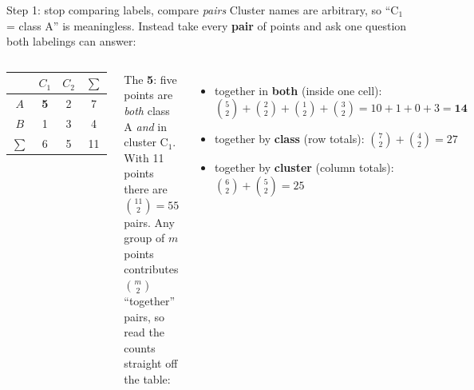 \documentclass[aspectratio=169]{beamer}
\begin{document}
\begin{frame}{Step 1: stop comparing labels, compare \emph{pairs}}
  Cluster names are arbitrary, so ``C$_1$ = class A'' is meaningless. Instead take every
  \textbf{pair} of points and ask one question both labelings can answer:
  \vskip 2pt
  \begin{center}
  \end{center}
  \vskip 4pt
  \begin{columns}[T]
    \begin{center}\small
      \renewcommand{\arraystretch}{1.25}
      \begin{tabular}{c|cc|c}
        & $C_1$ & $C_2$ & $\sum$ \\ \hline
        $A$ & \textbf{5} & 2 & 7 \\
        $B$ & 1 & 3 & 4 \\ \hline
        $\sum$ & 6 & 5 & 11 \\
      \end{tabular}
    \end{center}
    \vskip 2pt
    {\scriptsize The \textbf{5}: five points are \emph{both} class A \emph{and} in cluster C$_1$.}
    \small
    With 11 points there are $\binom{11}{2}=55$ pairs. Any group of $m$ points contributes
    $\binom{m}{2}$ ``together'' pairs, so read the counts straight off the table:
    \vskip 3pt
    \begin{itemize}\small
      \item together in \textbf{both} (inside one cell):\\
        $\binom52+\binom22+\binom12+\binom32 = 10+1+0+3 = \mathbf{14}$
      \item together by \textbf{class} (row totals): $\binom72+\binom42=27$
      \item together by \textbf{cluster} (column totals): $\binom62+\binom52=25$
    \end{itemize}
  \end{columns}
\end{frame}
\end{document}
